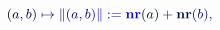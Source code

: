 \documentclass[12pt]{article}
\begin{document}
\makeatletter
\renewcommand*{\@textcolor}[3]{%
  \protect\leavevmode
  \begingroup
    \color#1{#2}#3%
  \endgroup
}
\makeatother
\begin{displaymath}
\mathcolor[RGB]{0,0,15}{(} \mathcolor[RGB]{0,0,30}{a} \mathcolor[RGB]{0,0,45}{,} \mathcolor[RGB]{0,0,60}{b} \mathcolor[RGB]{0,0,75}{)} \mathcolor[RGB]{0,0,90}{\mapsto} \mathcolor[RGB]{0,0,105}{\|} \mathcolor[RGB]{0,0,120}{(} \mathcolor[RGB]{0,0,135}{a} \mathcolor[RGB]{0,0,150}{,} \mathcolor[RGB]{0,0,165}{b} \mathcolor[RGB]{0,0,180}{)} \mathcolor[RGB]{0,0,195}{\|} \mathcolor[RGB]{0,0,210}{:} \mathcolor[RGB]{0,0,225}{=} \mathbf { \mathcolor[RGB]{0,0,240}{n} \mathcolor[RGB]{0,0,255}{r} } \mathcolor[RGB]{0,15,0}{(} \mathcolor[RGB]{0,15,15}{a} \mathcolor[RGB]{0,15,30}{)} \mathcolor[RGB]{0,15,45}{+} \mathbf { \mathcolor[RGB]{0,15,60}{n} \mathcolor[RGB]{0,15,75}{r} } \mathcolor[RGB]{0,15,90}{(} \mathcolor[RGB]{0,15,105}{b} \mathcolor[RGB]{0,15,120}{)} \mathcolor[RGB]{0,15,135}{,}
\end{displaymath}
\end{document}
